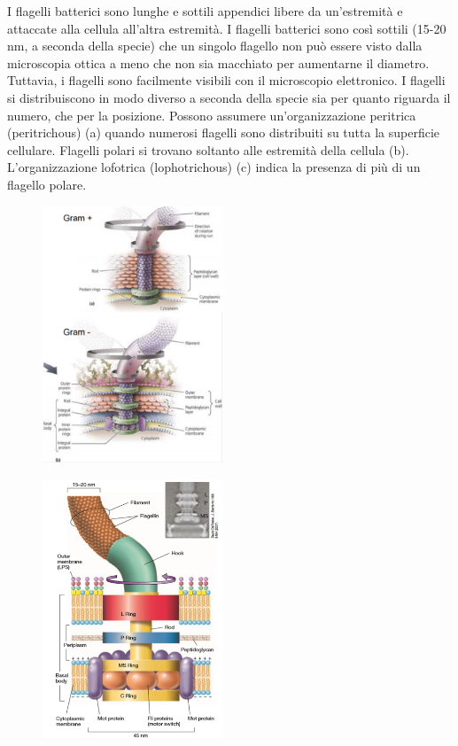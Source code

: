I flagelli batterici sono lunghe e sottili appendici libere da un'estremità e attaccate alla cellula all'altra estremità. I flagelli batterici sono così 
sottili (15-20 nm, a seconda della specie) che un singolo flagello non può essere visto dalla microscopia ottica a meno che non sia macchiato per aumentarne 
il diametro. Tuttavia, i flagelli sono facilmente visibili con il microscopio elettronico. I flagelli si distribuiscono in modo diverso a seconda della 
specie sia per quanto riguarda il numero, che per la posizione. Possono assumere un’organizzazione peritrica (peritrichous) (a) quando numerosi flagelli 
sono distribuiti su tutta la superficie cellulare. Flagelli polari si trovano soltanto alle estremità della cellula (b). L’organizzazione lofotrica 
(lophotrichous) (c) indica la presenza di più di un flagello polare. \\
\newpage
\begin{multicols}{2}
\begin{figure}[H]
	\includegraphics[width=0.48\textwidth]{Pictures/15.png}
\end{figure}
	
\begin{figure}[H]
	\includegraphics[width=0.48\textwidth]{Pictures/16.png}
\end{figure}
\end{multicols}


